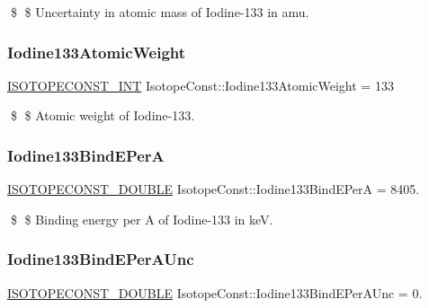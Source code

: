 \$ \$ Uncertainty in atomic mass of Iodine-\/133 in amu. \mbox{\label{group___isotope_const-_iodine-_i133_gade2963eb58691c7fdb0c79547a8b6e4c}} 
\subsubsection{\texorpdfstring{Iodine133\+Atomic\+Weight}{Iodine133AtomicWeight}}
{\footnotesize\ttfamily \mbox{\hyperlink{group___isotope_const-_macros_ga5f18360b3e99483a35c32d789e62621c}{I\+S\+O\+T\+O\+P\+E\+C\+O\+N\+S\+T\+\_\+\+I\+NT}} Isotope\+Const\+::\+Iodine133\+Atomic\+Weight = 133}

\$ \$ Atomic weight of Iodine-\/133. \mbox{\label{group___isotope_const-_iodine-_i133_ga3d4fa4a531f7b4109b1327d3c3f41556}} 
\subsubsection{\texorpdfstring{Iodine133\+Bind\+E\+PerA}{Iodine133BindEPerA}}
{\footnotesize\ttfamily \mbox{\hyperlink{group___isotope_const-_macros_ga8f45a7272ce02c0b4c65c44636ed719a}{I\+S\+O\+T\+O\+P\+E\+C\+O\+N\+S\+T\+\_\+\+D\+O\+U\+B\+LE}} Isotope\+Const\+::\+Iodine133\+Bind\+E\+PerA = 8405.}

\$ \$ Binding energy per A of Iodine-\/133 in keV. \mbox{\label{group___isotope_const-_iodine-_i133_ga2bd1c4f808f311861938d73ec4cc2569}} 
\subsubsection{\texorpdfstring{Iodine133\+Bind\+E\+Per\+A\+Unc}{Iodine133BindEPerAUnc}}
{\footnotesize\ttfamily \mbox{\hyperlink{group___isotope_const-_macros_ga8f45a7272ce02c0b4c65c44636ed719a}{I\+S\+O\+T\+O\+P\+E\+C\+O\+N\+S\+T\+\_\+\+D\+O\+U\+B\+LE}} Isotope\+Const\+::\+Iodine133\+Bind\+E\+Per\+A\+Unc = 0.}

